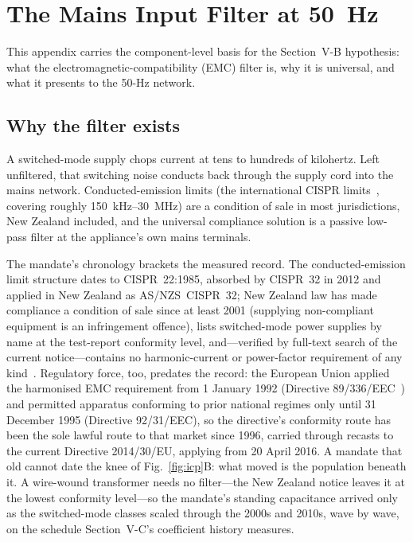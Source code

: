 \documentclass[journal]{IEEEtran}
\begin{document}
\section{The Mains Input Filter at 50~Hz}
This appendix carries the component-level basis for the Section~V-B
hypothesis: what the electromagnetic-compatibility (EMC) filter is, why it is
universal, and what it presents to the 50-Hz network.

\subsection{Why the filter exists}
A switched-mode supply chops current at tens to hundreds of kilohertz. Left
unfiltered, that switching noise conducts back through the supply cord into the
mains network. Conducted-emission limits (the international CISPR
limits~\cite{cispr32}, covering roughly 150~kHz--30~MHz) are a condition of
sale in most jurisdictions, New Zealand included, and the universal compliance
solution is a passive low-pass filter at the appliance's own mains terminals.

The mandate's chronology brackets the measured record. The conducted-emission
limit structure dates to CISPR~22:1985, absorbed by CISPR~32 in 2012 and
applied in New Zealand as AS/NZS~CISPR~32; New Zealand law has made compliance
a condition of sale since at least 2001 (supplying non-compliant equipment is
an infringement offence), lists switched-mode power supplies by name at the
test-report conformity level, and---verified by full-text search of the
current notice---contains no harmonic-current or power-factor requirement of
any kind~\cite{rsm_emc2019}. Regulatory force, too, predates the record: the
European Union applied the harmonised EMC requirement from 1 January 1992
(Directive 89/336/EEC~\cite{eu_emc1989}) and permitted apparatus conforming
to prior national regimes only until 31 December 1995 (Directive 92/31/EEC),
so the directive's conformity route has been the sole lawful route to that
market since 1996, carried through recasts to the current Directive
2014/30/EU, applying from 20 April 2016. A mandate that old cannot date the
knee of Fig.~\ref{fig:icp}B: what moved is the population beneath it. A
wire-wound transformer needs no filter---the New Zealand notice leaves it at
the lowest conformity level---so the mandate's standing capacitance arrived
only as the switched-mode classes scaled through the 2000s and 2010s, wave by
wave, on the schedule Section~V-C's coefficient history measures.
\end{document}
